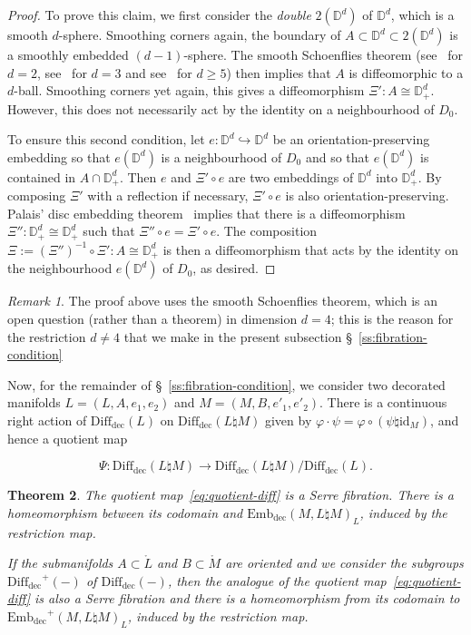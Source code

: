 \documentclass[10pt,a4paper]{amsart}
\numberwithin{equation}{section}
\newcommand{\id}{\mathrm{id}}
\newcommand{\Int}{\mathring}
\newcommand{\rdec}{\mathrm{dec}}
\newcommand{\bD}{\mathbb{D}}
\newcommand{\too}{\ensuremath{\longrightarrow}}
\newcommand{\diffdec}{\ensuremath{\mathrm{Diff}_{\rdec}}}
\newcommand{\embdec}{\ensuremath{\mathrm{Emb}_{\rdec}}}
\renewcommand{\geq}{\geqslant}
\newtheorem{theo}{Theorem}[section]
\theoremstyle{definition}
\theoremstyle{remark}
\newtheorem{rema}[theo]{Remark}
\begin{document}
\begin{proof}
To prove this claim, we first consider the \emph{double} $2(\bD^d)$ of $\bD^d$, which is a smooth $d$-sphere. Smoothing corners again, the boundary of $A \subset \bD^d \subset 2(\bD^d)$ is a smoothly embedded $(d-1)$-sphere. The smooth Schoenflies theorem (see~\cite{Schoenflies1906} for $d=2$, see~\cite{Brown1960,Mazur1959,Morse1960} for $d=3$ and see~\cite[Prop.~D, \S~9]{Milnor1965} for $d\geq 5$) then implies that $A$ is diffeomorphic to a $d$-ball. Smoothing corners yet again, this gives a diffeomorphism $\Xi' \colon A \cong \bD^d_+$. However, this does not necessarily act by the identity on a neighbourhood of $D_0$.

To ensure this second condition, let $e \colon \bD^d \hookrightarrow \bD^d$ be an orientation-preserving embedding so that $e(\bD^d)$ is a neighbourhood of $D_0$ and so that $e(\bD^d)$ is contained in $A \cap \bD^d_+$. Then $e$ and $\Xi' \circ e$ are two embeddings of $\bD^d$ into $\bD^d_+$. By composing $\Xi'$ with a reflection if necessary, $\Xi' \circ e$ is also orientation-preserving. Palais' disc embedding theorem~\cite[Thm.~B]{Palais1960Extendingdiffeomorphisms} implies that there is a diffeomorphism $\Xi'' \colon \bD^d_+ \cong \bD^d_+$ such that $\Xi'' \circ e = \Xi' \circ e$. The composition $\Xi := (\Xi'')^{-1} \circ \Xi' \colon A \cong \bD^d_+$ is then a diffeomorphism that acts by the identity on the neighbourhood $e(\bD^d)$ of $D_0$, as desired.
\end{proof}

\begin{rema}\label{rmk:d_neq_4_explanation}
The proof above uses the smooth Schoenflies theorem, which is an open question (rather than a theorem) in dimension $d=4$; this is the reason for the restriction $d \neq 4$ that we make in the present subsection \S~\ref{ss:fibration-condition}\end{rema}

Now, for the remainder of \S~\ref{ss:fibration-condition}, we consider two decorated manifolds $L = (L,A,e_{1},e_{2})$ and $M = (M,B,e'_{1},e'_{2})$. There is a continuous right action of $\diffdec(L)$ on $\diffdec(L \natural M)$ given by $\varphi \cdot \psi = \varphi \circ (\psi \natural \id_M)$, and hence a quotient map

\setcounter{equation}{22}
\begin{equation}\label{eq:quotient-diff}
\Psi \colon \diffdec(L \natural M) \too \diffdec(L \natural M) / \diffdec(L).
\end{equation}


\begin{theo}\label{thm:fibre-bundle}
The quotient map~\eqref{eq:quotient-diff} is a Serre fibration. There is a homeomorphism between its codomain and $\embdec(M,L \natural M)_L$, induced by the restriction map.

If the submanifolds $A \subset \Int{L}$ and $B \subset \Int{M}$ are oriented and we consider the subgroups $\diffdec^{+}(-)$ of $\diffdec(-)$, then the analogue of the quotient map~\eqref{eq:quotient-diff} is also a Serre fibration and there is a homeomorphism from its codomain to $\embdec^{+}(M,L \natural M)_L$, induced by the restriction map.
\end{theo}
\end{document}
